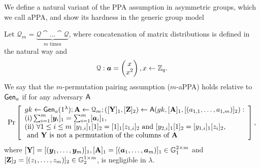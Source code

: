 We define a natural variant of the PPA assumption in asymmetric groups, which we call aPPA, and show its hardness in the generic group model

%
\begin{definition}
Let $\mathcal{Q}_{m}=\underbrace{\mathcal{Q}\cat\ldots\cat\mathcal{Q}}_{m\text{ times}}$, where concatenation of matrix distributions is defined in the natural way and 
$$\mathcal{Q}: {\boldsymbol{a}}=\left(\begin{matrix}x\\x^2\end{matrix}\right), x\gets\mathbb{Z}_q.$$
We say that the $m$-permutation pairing assumption ($m$-aPPA) holds relative to $\mathsf{Gen}_a$ if for any adversary $\mathsf{A}$
$$
\Pr\left[
\begin{array}{l}
	gk\gets\G_a(1^\lambda);\matr{A}\gets\mathcal{Q}_{m};([\matr{Y}]_1,[\matr{Z}]_2)\gets\advA(gk,[\matr{A}]_1,[(a_{1,1},\ldots,a_{1,m})]_2):\\
	\mathrm{(i)} \sum_{i=1}^{m}[\vecb{y}_i]_1 = \sum_{i=1}^{m}[\vecb{a}_i]_1,\\
	\mathrm{(ii)}\ \forall 1\leq i\leq m\ [y_{1,i}]_1[1]_2=[1]_1[z_{1,i}]_2 \text{ and } [y_{2,i}]_1[1]_2=[y_{1,i}]_1[z_{i}]_2,\\
	\text{ and }\matr{Y}\text{ is not a permutation of the columns of }\matr{A}
\end{array}
\right],
$$
where $[\mathbf{{Y}}]=[({\boldsymbol{y}}_1,\ldots,{\boldsymbol{y}}_m)]_1, [\mathbf{{A}}]_1=[({\boldsymbol{a}}_1,\ldots,{\boldsymbol{a}}_m)]_1\in\mathbb{G}_1^{2\times m}$ and $[\mathbf{{Z}}]_2=\allowbreak [(z_1,\ldots,\allowbreak z_m)]_2\in\mathbb{G}_2^{1\times m}$, is negligible in $\lambda$.
\end{definition}

